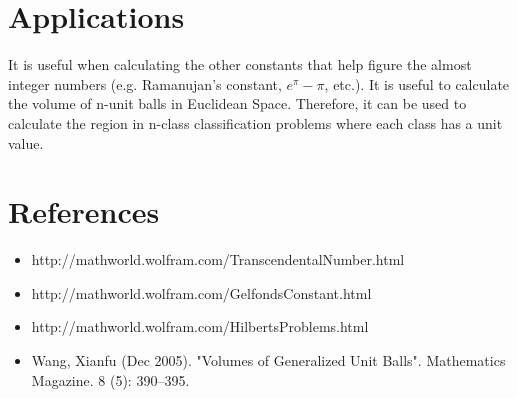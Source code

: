 \documentclass{article}
\begin{document}
\section{Applications}
\begin{flushleft}
\justifying
It is useful when calculating the other constants that help figure the almost integer numbers (e.g. Ramanujan's constant, $e^{\pi} - \pi$, etc.). It is useful to calculate the volume of n-unit balls in Euclidean Space. Therefore, it can be used to calculate the region in n-class classification problems where each class has a unit value. 
\end{flushleft}

\section{References}
\begin{itemize}
  \item http://mathworld.wolfram.com/TranscendentalNumber.html
  \item http://mathworld.wolfram.com/GelfondsConstant.html
  \item http://mathworld.wolfram.com/HilbertsProblems.html
  \item Wang, Xianfu (Dec 2005). "Volumes of Generalized Unit Balls". Mathematics Magazine. 8 (5): 390–395.
\end{itemize}
\end{document}
